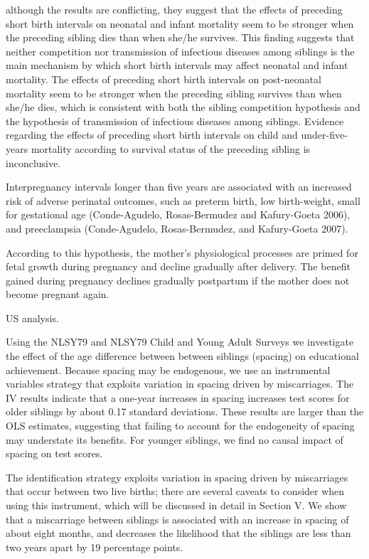 although the results are conflicting, they suggest that the effects of
preceding short birth intervals on neonatal and infant mortality seem to
be stronger when the preceding sibling dies than when she/he survives.
This finding suggests that neither competition nor transmission of
infectious diseases among siblings is the main mechanism by which short
birth intervals may affect neonatal and infant mortality. The effects of
preceding short birth intervals on post-neonatal mortality seem to be
stronger when the preceding sibling survives than when she/he dies,
which is consistent with both the sibling competition hypothesis and the
hypothesis of transmission of infectious diseases among siblings.
Evidence regarding the effects of preceding short birth intervals on
child and under-five-years mortality according to survival status of the
preceding sibling is inconclusive.

Interpregnancy intervals longer than five years are associated with an
increased risk of adverse perinatal outcomes, such as preterm birth, low
birth-weight, small for gestational age (Conde-Agudelo, Rosas-Bermudez
and Kafury-Goeta 2006), and preeclampsia (Conde-Agudelo, Rosas-Bermudez,
and Kafury-Goeta 2007).

According to this hypothesis, the mother’s physiological processes are
primed for fetal growth during pregnancy and decline gradually after
delivery. The benefit gained during pregnancy declines gradually
postpartum if the mother does not become pregnant again.

\citet{Buckles2012}

US analysis.

Using the NLSY79 and NLSY79 Child and Young Adult Surveys we investigate 
the effect of the age difference between between siblings (spacing) on
educational achievement. Because spacing may be endogenous, we use an
instrumental variables strategy that exploits variation in spacing driven
by miscarriages. The IV results indicate that a one-year increases in
spacing increases test scores for older siblings by about 0.17 standard
deviations. These results are larger than the OLS estimates, suggesting
that failing to account for the endogeneity of spacing may understate
its benefits. For younger siblings, we find no causal impact of spacing
on test scores.

The identification strategy exploits variation in spacing driven by 
miscarriages that occur between two live births; there are several caveats to 
consider when using this instrument, which will be discussed in detail in Section V. 
We show that a miscarriage between siblings is associated with an increase in 
spacing of about eight months, and decreases the likelihood that the siblings 
are less than two years apart by 19 percentage points.

